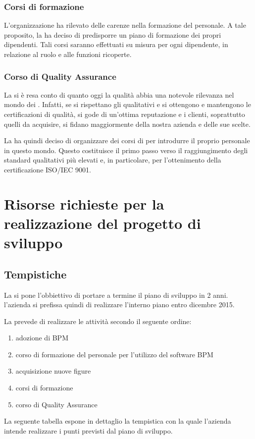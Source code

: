 \subsubsection{Corsi di formazione} 
L'organizzazione ha rilevato delle carenze nella formazione del personale. A tale proposito, la \customer ha deciso di predisporre un piano di formazione dei propri dipendenti. Tali corsi saranno effettuati su misura per ogni dipendente, in relazione al ruolo e alle funzioni ricoperte. 


\subsubsection{Corso di Quality Assurance}
 La \customer si è resa conto di quanto oggi la qualità abbia una notevole rilevanza nel mondo dei . Infatti, se si rispettano gli  qualitativi e si ottengono e mantengono le certificazioni di qualità, si gode di un'ottima reputazione e i clienti, soprattutto quelli da acquisire, si fidano maggiormente della nostra azienda e delle sue scelte.

La \customer ha quindi deciso di organizzare dei corsi di  per introdurre il proprio personale in questo mondo. Questo costituisce il primo passo verso il raggiungimento degli standard qualitativi più elevati e, in particolare,  per l'ottenimento della certificazione ISO/IEC 9001.

  
  
\section{Risorse richieste per la realizzazione del progetto di sviluppo}
\subsection{Tempistiche}
La \customer si pone l'obbiettivo di portare a termine il piano di sviluppo in 2 anni. l'azienda si prefissa quindi di realizzare l'interno piano entro dicembre 2015.       
	
La \customer prevede di realizzare le attività secondo il seguente ordine:
\begin{enumerate}
\item adozione di  BPM
\item corso di formazione del personale per l'utilizzo del software BPM
\item acquisizione nuove figure
\item corsi di formazione 
\item corso di Quality Assurance
\end{enumerate}   
La seguente tabella espone in dettaglio la tempistica con la quale l'azienda intende realizzare i punti previsti dal piano di sviluppo.
     
